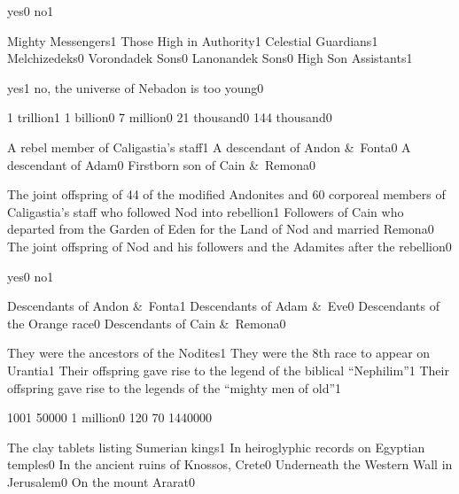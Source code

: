 {yes}{0}
{no}{1}
\qstop

{Mighty Messengers}{1}
{Those High in Authority}{1}
{Celestial Guardians}{1}
{Melchizedeks}{0}
{Vorondadek Sons}{0}
{Lanonandek Sons}{0}
{High Son Assistants}{1}
\qstop

{yes}{1}
{no, the universe of Nebadon is too young}{0}
\qstop

{1 trillion}{1}
{1 billion}{0}
{7 million}{0}
{21 thousand}{0}
{144 thousand}{0}
\qstop

{A rebel member of Caligastia's staff}{1}
{A descendant of Andon \&\ Fonta}{0}
{A descendant of Adam}{0}
{Firstborn son of Cain \&\ Remona}{0}
\qstop

{The joint offspring of 44 of the modified Andonites and 60 corporeal members of Caligastia's staff who followed Nod into rebellion}{1}
{Followers of Cain who departed from the Garden of Eden for the Land of Nod and married Remona}{0}
{The joint offspring of Nod and his followers and the Adamites after the rebellion}{0}
\qstop

{yes}{0}
{no}{1}
\qstop

{Descendants of Andon \&\ Fonta}{1}
{Descendants of Adam \&\ Eve}{0}
{Descendants of the Orange race}{0}
{Descendants of Cain \&\ Remona}{0}
\qstop

{They were the ancestors of the Nodites}{1}
{They were the 8th race to appear on Urantia}{1}
{Their offspring gave rise to the legend of the biblical ``Nephilim''}{1}
{Their offspring gave rise to the legends of the ``mighty men of old''}{1}
\qstop

{100}{1}
{5000}{0}
{1 million}{0}
{12}{0}
{7}{0}
{144000}{0}
\qstop

{The clay tablets listing Sumerian kings}{1}
{In heiroglyphic records on Egyptian temples}{0}
{In the ancient ruins of Knossos, Crete}{0}
{Underneath the Western Wall in Jerusalem}{0}
{On the mount Ararat}{0}
\qstop

